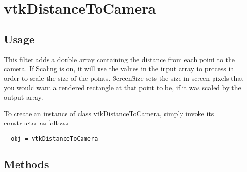 \section{vtkDistanceToCamera}

\subsection{Usage}

 This filter adds a double array containing the distance from each point
 to the camera. If Scaling is on, it will use the values in the input
 array to process in order to scale the size of the points. ScreenSize
 sets the size in screen pixels that you would want a rendered rectangle
 at that point to be, if it was scaled by the output array.

To create an instance of class vtkDistanceToCamera, simply
invoke its constructor as follows
\begin{verbatim}
  obj = vtkDistanceToCamera
\end{verbatim}
\subsection{Methods}


